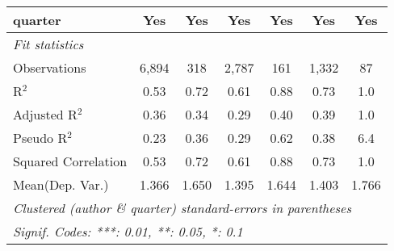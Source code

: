 \begin{tabular}{lcccccc}
   quarter                                                    & Yes          & Yes          & Yes            & Yes           & Yes           & Yes\\  
   \midrule
   \emph{Fit statistics}\\
   Observations                                               & 6,894        & 318          & 2,787          & 161           & 1,332         & 87\\  
   R$^2$                                                      & 0.53         & 0.72         & 0.61           & 0.88          & 0.73          & 1.0\\  
   Adjusted R$^2$                                             & 0.36         & 0.34         & 0.29           & 0.40          & 0.39          & 1.0\\  
   Pseudo R$^2$                                               & 0.23         & 0.36         & 0.29           & 0.62          & 0.38          & 6.4\\  
   Squared Correlation                                        & 0.53         & 0.72         & 0.61           & 0.88          & 0.73          & 1.0\\  
Mean(Dep. Var.) & 1.366 & 1.650 & 1.395 & 1.644 & 1.403 & 1.766 \\
   \midrule \midrule
   \multicolumn{7}{l}{\emph{Clustered (author \& quarter) standard-errors in parentheses}}\\
   \multicolumn{7}{l}{\emph{Signif. Codes: ***: 0.01, **: 0.05, *: 0.1}}\\
\end{tabular}
\par\endgroup

